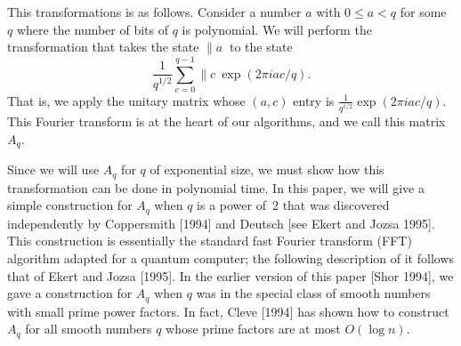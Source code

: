This transformations is as follows.
Consider a number $a$ with $0 \leq a < q$ for some
$q$ where the number of bits of $q$ is polynomial.  We will perform the
transformation that takes the state $\|a\>$ to the state
\begin{equation}
\frac{1}{q^{1/2}} \sum_{c=0}^{q-1} \|c\> \exp(2 \pi i ac/q).
\label{ft}
\end{equation}
That is, we apply
the unitary matrix whose 
$(a,c)$ entry is
$\frac{1}{q^{1/2}}\exp(2 \pi i ac/q)$.   
This Fourier transform is at the heart of our algorithms, and we call
this matrix~$A_q$.  

Since we will use $A_q$ for $q$ of exponential size, we must show how this 
transformation can be done in polynomial time.  In this paper, we will
give a simple construction for $A_q$ when $q$ is a power of~2 that was
discovered independently by Coppersmith [1994] and Deutsch 
[see Ekert and Jozsa 1995].  This construction is essentially the
standard fast Fourier transform (FFT) algorithm \cite{Knut}
adapted for a quantum computer; the following description of it 
follows that of Ekert and Jozsa [1995]. 
In the earlier version of this paper [Shor 1994], we gave a 
construction for $A_q$ when $q$ was in the special class of smooth numbers 
with small prime power factors.  In fact, Cleve [1994] has shown how 
to construct $A_q$ for all smooth numbers $q$
whose prime factors are at most $O(\log n)$.  

